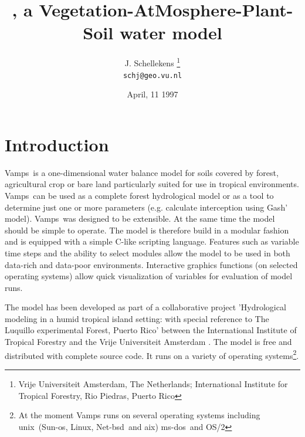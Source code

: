 \documentclass[twocolumn]{article}
\title{\vamps, a Vegetation-AtMosphere-Plant-Soil water model}
\author{J. Schellekens
\thanks{Vrije Universiteit Amsterdam, The Netherlands; International
Institute for Tropical Forestry, Rio Piedras, Puerto Rico}\\ 
{\tt schj@geo.vu.nl}}
\date{April, 11 1997}
\newcommand{\vamps}{{\sf Vamps}}
\newcommand{\unix}{{\sc unix}}
\newcommand{\linux}{Linux}
\newcommand{\netbsd}{Net-{\sc bsd}}
\newcommand{\msdos}{{\sc ms-dos}}
\newcommand{\ostwo} {{\sc OS/2}}
\newcommand{\aix}{{\sc aix}}
\newcommand{\sunos}{Sun-{\sc os}}
\begin{document}
\setlength{\parindent}{0pt}
\setlength{\parskip}{0.3cm}
\setlength{\textwidth}{1.2\textwidth}


\maketitle

\section*{Introduction}
\vamps\ is a one-dimensional water balance model for soils covered
by forest, agricultural crop or bare land particularly suited for use
in tropical environments.  \vamps\ can be used as a complete forest
hydrological model or as a tool to determine just one or more parameters
(e.g. calculate interception using Gash' model). \vamps\ was designed to
be extensible. At the same time the model should be simple to operate. The
model is therefore build in a modular fashion and is equipped with
a simple C-like scripting language.  Features such as  variable time
steps and the ability to select modules allow the model to be used in
both data-rich and data-poor environments. Interactive graphics functions
(on selected operating systems) allow quick visualization of variables
for evaluation of model runs.

The model has been developed as part of a collaborative project
'Hydrological modeling in a humid tropical island setting: with
special reference to The Luquillo experimental Forest, Puerto Rico'
between the International Institute of Tropical Forestry and the Vrije
Universiteit Amsterdam \cite{bruijnzeel1994}.  The model is free and
distributed with complete source code. It runs on a variety of operating
systems\footnote{At the moment \vamps{} runs on several operating
systems including \unix\ (\sunos{}, \linux{}, \netbsd\ and \aix{})
\msdos\ and \ostwo{}}.
\end{document}
